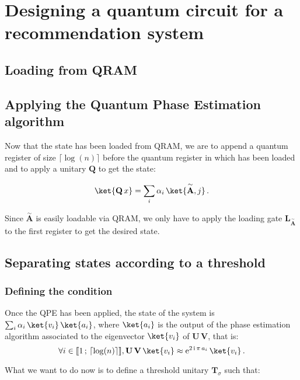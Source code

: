 \documentclass[11pt, a4paper]{article}
\begin{document}
    \section{Designing a quantum circuit for a recommendation system}
        \label{sec:QCircuit}
        \subsection{Loading from QRAM}
            \label{subsec:QRAM}
        \subsection{Applying the Quantum Phase Estimation algorithm}
            \label{subsec:ImplementingQPE}
            Now that the state  has been loaded from QRAM, we are to append a quantum register of size \(\lceil\log(n)\rceil\) before the quantum register in which  has been loaded and to apply a unitary \(\mathbf{Q}\) to get the state:
            
            \[\ket{\mathbf{Q}\,x}=\sum_i\alpha_i\,\ket{\overset{\sim}{\mathbf{A}}, j}\,.\]
            
            Since \(\overset{\sim}{\mathbf{A}}\) is easily loadable via QRAM, we only have to apply the loading gate \(\mathbf{L}_{\overset{\sim}{\mathbf{A}}}\) to the first register to get the desired state.
            
        \subsection{Separating states according to a threshold}
            \label{subsec:Threshold}
            \subsubsection{Defining the condition}
                Once the QPE has been applied, the state of the system is \(\sum_i\alpha_i\,\ket{v_i}\,\ket{a_i}\), where \(\ket{a_i}\) is the output of the phase estimation algorithm associated to the eigenvector \(\ket{v_i}\) of \(\mathbf{U}\,\mathbf{V}\), that is:
                \[\forall i\in\llbracket1\,;\,\lceil\log(n)\rceil\rrbracket,\mathbf{U}\,\mathbf{V}\,\ket{v_i}\approx\mathrm{e}^{2\,\mathrm{i}\,\pi\,a_i}\,\ket{v_i}\,.\]
                
                What we want to do now is to define a threshold unitary \(\mathbf{T}_\sigma\) such that:
                
\end{document}
